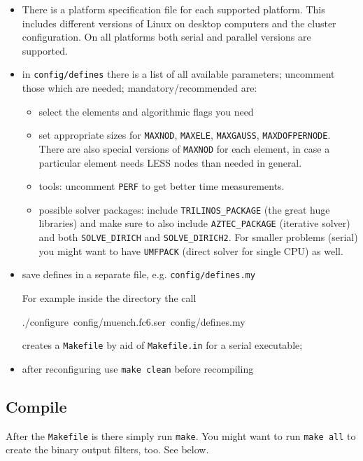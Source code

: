 \begin{itemize}
\item There is a platform specification file for each supported platform.
This includes different versions of Linux on desktop computers and
the cluster configuration. On all platforms both serial and parallel
versions are supported.
\item in \texttt{config/defines} there is a list of all available parameters;
uncomment those which are needed; mandatory/recommended are: 

\begin{itemize}
\item select the elements and algorithmic flags you need
\item set appropriate sizes for \texttt{MAXNOD}, \texttt{MAXELE}, \texttt{MAXGAUSS},
\texttt{MAXDOFPERNODE}. There are also special versions of \texttt{MAXNOD}
for each element, in case a particular element needs LESS nodes than
needed in general.
\item tools: uncomment \texttt{PERF} to get better time measurements.
\item possible solver packages: include \texttt{TRILINOS\_PACKAGE} (the
great huge libraries) and make sure to also include \texttt{AZTEC\_PACKAGE}
(iterative solver) and both \texttt{SOLVE\_DIRICH} and \texttt{SOLVE\_DIRICH2}.
For smaller problems (serial) you might want to have \texttt{UMFPACK}
(direct solver for single CPU) as well.
\end{itemize}
\item save defines in a separate file, e.g. \texttt{config/defines.my} 


For example inside the \ccarat{} directory the call

\begin{lyxcode}
./configure~config/muench.fc6.ser~config/defines.my~
\end{lyxcode}
creates a \texttt{Makefile} by aid of \texttt{Makefile.in} for a serial
executable; 

\item after reconfiguring use \texttt{make clean} before recompiling
\end{itemize}

\subsection{Compile}

After the \texttt{Makefile} is there simply run \texttt{make}. You
might want to run \texttt{make all} to create the binary output filters,
too. See below.

